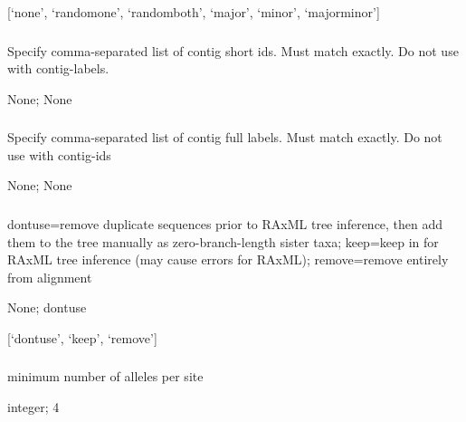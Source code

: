 \documentclass[letterpaper,11pt,english]{sphinxmanual}
\begin{document}
 {[}‘none’, ‘randomone’, ‘randomboth’, ‘major’, ‘minor’, ‘majorminor’{]}


\subsubsection{}
\label{\detokenize{prog_desc:id121}}
 Specify comma-separated list of contig short ids. Must match exactly. Do not use with \textendash{}contig-labels.

 None;  None


\subsubsection{}
\label{\detokenize{prog_desc:id122}}
 Specify comma-separated list of contig full labels. Must match exactly. Do not use with \textendash{}contig-ids

 None;  None


\subsubsection{}
\label{\detokenize{prog_desc:duplicate-seq-duplicateseq}}
 dontuse=remove duplicate sequences prior to RAxML tree inference, then add them to the tree manually as zero-branch-length sister taxa; keep=keep in for RAxML tree inference (may cause errors for RAxML); remove=remove entirely from alignment

 None;  dontuse

 {[}‘dontuse’, ‘keep’, ‘remove’{]}


\subsubsection{}
\label{\detokenize{prog_desc:min-depth-mindepth}}
 minimum number of alleles per site

 integer;  4
\end{document}
